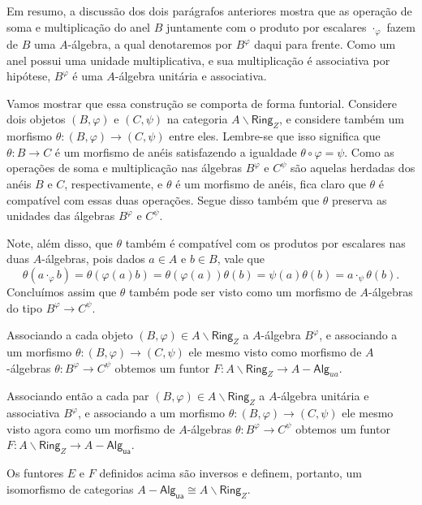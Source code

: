 Em resumo, a discussão dos dois parágrafos anteriores mostra que as operação de soma e multiplicação do anel $B$ juntamente com o produto por escalares $\cdot_{\varphi}$ fazem de $B$ uma $A$-álgebra, a qual denotaremos por $B^{\varphi}$ daqui para frente.
Como um anel possui uma unidade multiplicativa, e sua multiplicação é associativa por hipótese, $B^{\varphi}$ é uma $A$-álgebra unitária e associativa.

Vamos mostrar que essa construção se comporta de forma funtorial.
Considere dois objetos $(B,\varphi)$ e $(C,\psi)$ na categoria $A \backslash \mathsf{Ring}_{Z}$, e considere também um morfismo $\theta: (B,\varphi) \to (C,\psi)$ entre eles.
Lembre-se que isso significa que $\theta: B \to C$ é um morfismo de anéis satisfazendo a igualdade $\theta \circ \varphi = \psi$.
Como as operações de soma e multiplicação nas álgebras $B^{\varphi}$ e $C^{\psi}$ são aquelas herdadas dos anéis $B$ e $C$, respectivamente, e $\theta$ é um morfismo de anéis, fica claro que $\theta$ é compatível com essas duas operações.
Segue disso também que $\theta$ preserva as unidades das álgebras $B^{\varphi}$ e $C^{\psi}$.

Note, além disso, que $\theta$ também é compatível com os produtos por escalares nas duas $A$-álgebras, pois dados $a \in A$ e $b \in B$, vale que
\begin{displaymath}
  \theta(a \cdot_{\varphi} b) = \theta(\varphi(a)b) = \theta(\varphi(a))\theta(b) = \psi(a)\theta(b) = a \cdot_{\psi} \theta(b).
\end{displaymath}
Concluímos assim que $\theta$ também pode ser visto como um morfismo de $A$-álgebras do tipo $B^{\varphi} \to C^{\psi}$.

Associando a cada objeto $(B,\varphi) \in A \backslash \mathsf{Ring}_{Z}$ a $A$-álgebra $B^{\varphi}$, e associando a um morfismo $\theta: (B,\varphi) \to (C,\psi)$ ele mesmo visto como morfismo de $A$-álgebras $\theta: B^{\varphi} \to C^{\psi}$ obtemos um funtor $F: A \backslash \mathsf{Ring}_{Z} \to A-\mathsf{Alg}_{ua}$.

Associando então a cada par $(B,\varphi) \in A \backslash \mathsf{Ring}_{Z}$ a $A$-álgebra unitária e associativa $B^{\varphi}$, e associando a um morfismo $\theta: (B,\varphi) \to (C,\psi)$ ele mesmo visto agora como um morfismo de $A$-álgebras $\theta: B^{\varphi} \to C^{\psi}$ obtemos um funtor $F: A \backslash \mathsf{Ring}_{Z} \to A-\mathsf{Alg_{ua}}$.

\begin{teo}\label{teo:equiv_algebras_e_setas_aneis}
  Os funtores $E$ e $F$ definidos acima são inversos e definem, portanto, um isomorfismo de categorias $A-\mathsf{Alg_{ua}} \cong A \backslash \mathsf{Ring}_{Z}$.
\end{teo}

